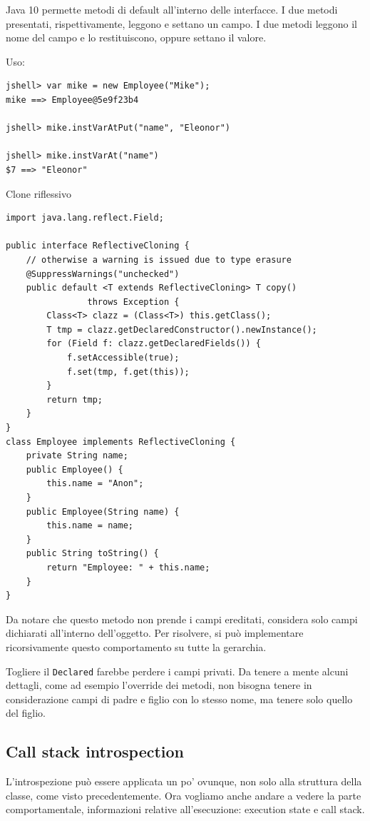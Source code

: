Java 10 permette metodi di default all'interno delle interfacce. I due metodi presentati, rispettivamente, leggono e settano un campo. I due metodi leggono il nome del campo e lo restituiscono, oppure settano il valore.

Uso:
\begin{verbatim}
jshell> var mike = new Employee("Mike");
mike ==> Employee@5e9f23b4

jshell> mike.instVarAtPut("name", "Eleonor")

jshell> mike.instVarAt("name")
$7 ==> "Eleonor"
\end{verbatim}

Clone riflessivo
\begin{verbatim}
import java.lang.reflect.Field;

public interface ReflectiveCloning {
    // otherwise a warning is issued due to type erasure
    @SuppressWarnings("unchecked")
    public default <T extends ReflectiveCloning> T copy()
                throws Exception {
        Class<T> clazz = (Class<T>) this.getClass();
        T tmp = clazz.getDeclaredConstructor().newInstance();
        for (Field f: clazz.getDeclaredFields()) {
            f.setAccessible(true);
            f.set(tmp, f.get(this));
        }
        return tmp;
    }
}
class Employee implements ReflectiveCloning {
    private String name;
    public Employee() {
        this.name = "Anon";
    }
    public Employee(String name) {
        this.name = name;
    }
    public String toString() {
        return "Employee: " + this.name;
    }
}
\end{verbatim}

Da notare che questo metodo non prende i campi ereditati, considera solo campi dichiarati all'interno dell'oggetto. Per risolvere, si può implementare ricorsivamente questo comportamento su tutte la gerarchia.

Togliere il \texttt{Declared} farebbe perdere i campi privati. Da tenere a mente alcuni dettagli, come ad esempio l'override dei metodi, non bisogna tenere in considerazione campi di padre e figlio con lo stesso nome, ma tenere solo quello del figlio.


\subsection{Call stack introspection}

L'introspezione può essere applicata un po' ovunque, non solo alla struttura della classe, come visto precedentemente. Ora vogliamo anche andare a vedere la parte comportamentale, informazioni relative all'esecuzione: execution state e call stack.

